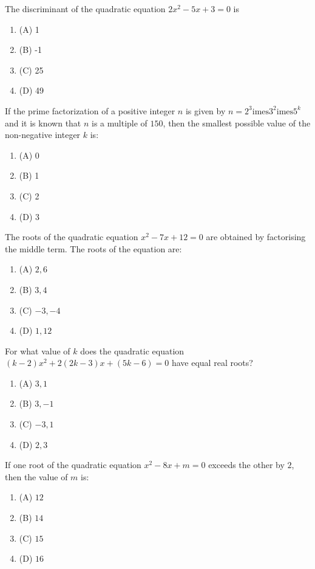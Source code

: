 \documentclass[12pt,a4paper]{exam}
\begin{document}
\begin{questions}
\question[1] The discriminant of the quadratic equation $2x^2 - 5x + 3 = 0$ is
\begin{enumerate}[label=(\Alph*)]
  \item (A) 1
  \item (B) -1
  \item (C) 25
  \item (D) 49
\end{enumerate}
\vspace{0.15cm}

\question[1] If the prime factorization of a positive integer $n$ is given by $n = 2^3 \text{imes} 3^2 \text{imes} 5^k$ and it is known that $n$ is a multiple of $150$, then the smallest possible value of the non-negative integer $k$ is:
\begin{enumerate}[label=(\Alph*)]
  \item (A) 0
  \item (B) 1
  \item (C) 2
  \item (D) 3
\end{enumerate}
\vspace{0.15cm}

\question[1] The roots of the quadratic equation $x^2 - 7x + 12 = 0$ are obtained by factorising the middle term. The roots of the equation are:
\begin{enumerate}[label=(\Alph*)]
  \item (A) $2, 6$
  \item (B) $3, 4$
  \item (C) $-3, -4$
  \item (D) $1, 12$
\end{enumerate}
\vspace{0.15cm}

\question[1] For what value of $k$ does the quadratic equation $(k-2)x^2 + 2(2k-3)x + (5k-6) = 0$ have equal real roots?
\begin{enumerate}[label=(\Alph*)]
  \item (A) $3, 1$
  \item (B) $3, -1$
  \item (C) $-3, 1$
  \item (D) $2, 3$
\end{enumerate}
\vspace{0.15cm}

\question[1] If one root of the quadratic equation $x^2 - 8x + m = 0$ exceeds the other by $2$, then the value of $m$ is:
\begin{enumerate}[label=(\Alph*)]
  \item (A) $12$
  \item (B) $14$
  \item (C) $15$
  \item (D) $16$
\end{enumerate}
\vspace{0.15cm}


\end{questions}
\end{document}
